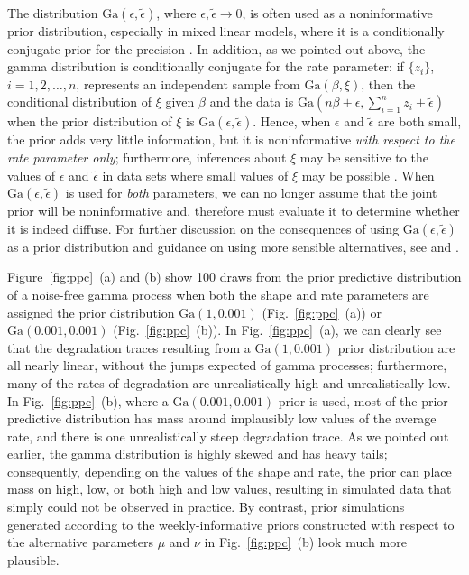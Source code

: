 The distribution $\mbox{Ga}(\epsilon, \tilde{\epsilon})$, where $\epsilon, \tilde{\epsilon}\longrightarrow 0$, is often used as a noninformative prior distribution, especially in mixed linear models, where it is a conditionally conjugate prior for the precision \citep[p.~33]{hodges_2014}. In addition, as we pointed out above, the gamma distribution is conditionally conjugate for the rate parameter: if $\{ z_i \}$, $i = 1, 2, \ldots, n$, represents an independent sample from $\mbox{Ga}(\beta, \xi)$, then the conditional distribution of $\xi$ given $\beta$ and the data is $\mbox{Ga}(n\beta + \epsilon, \sum_{i=1}^n z_i + \tilde{\epsilon})$ when the prior distribution of $\xi$ is $\mbox{Ga}(\epsilon, \tilde{\epsilon})$. Hence, when $\epsilon$ and $\tilde{\epsilon}$ are both small, the prior adds very little information, but it is noninformative \textit{with respect to the rate parameter only}; furthermore, inferences about $\xi$ may be sensitive to the values of $\epsilon$ and $\tilde{\epsilon}$ in data sets where small values of $\xi$ may be possible \citep[p.~130]{gelman_workflow_2020}. When $\mbox{Ga}(\epsilon, \tilde{\epsilon})$ is used for \textit{both} parameters, we can no longer assume that the joint prior will be noninformative and, therefore must evaluate it to determine whether it is indeed diffuse. For further discussion on the consequences of using $\mbox{Ga}(\epsilon, \tilde{\epsilon})$ as a prior distribution and guidance on using more sensible alternatives, see \cite{hodges_2014} and \cite{gelman_workflow_2020}.

Figure~\ref{fig:ppc}~(a) and (b) show 100 draws from the prior predictive distribution of a noise-free gamma process when both the shape and rate parameters are assigned the prior distribution $\mbox{Ga}(1, 0.001)$ (Fig.~\ref{fig:ppc}~(a)) or $\mbox{Ga}(0.001, 0.001)$ (Fig.~\ref{fig:ppc}~(b)). In Fig.~\ref{fig:ppc}~(a), we can clearly see that the degradation traces resulting from a $\mbox{Ga}(1, 0.001)$ prior distribution are all nearly linear, without the jumps expected of gamma processes; furthermore, many of the rates of degradation are unrealistically high and unrealistically low. In Fig.~\ref{fig:ppc}~(b), where a $\mbox{Ga}(0.001, 0.001)$ prior is used, most of the prior predictive distribution has mass around implausibly low values of the average rate, and there is one unrealistically steep degradation trace. As we pointed out earlier, the gamma distribution is highly skewed and has heavy tails; consequently, depending on the values of the shape and rate, the prior can place mass on high, low, or both high and low values, resulting in simulated data that simply could not be observed in practice. By contrast, prior simulations generated according to the weekly-informative priors constructed with respect to the alternative parameters $\mu$ and $\nu$ in Fig.~\ref{fig:ppc}~(b) look much more plausible.

